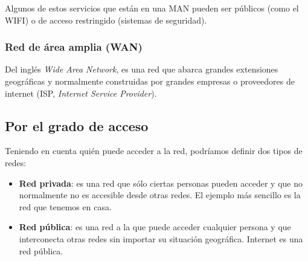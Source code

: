Algunos de estos servicios que están en una MAN pueden ser públicos (como el WIFI) o de acceso restringido (sistemas de seguridad).

\subsubsection{Red de área amplia (WAN)}
Del inglés \textit{Wide Area Network}, es una red que abarca grandes extensiones geográficas y normalmente construidas por grandes empresas o proveedores de internet (ISP, \textit{Internet Service Provider}).


\subsection{Por el grado de acceso}
Teniendo en cuenta quién puede acceder a la red, podríamos definir dos tipos de redes:

\begin{itemize}
    \item \textbf{Red privada}: es una red que sólo ciertas personas pueden acceder y que no normalmente no es accesible desde otras redes. El ejemplo más sencillo es la red que tenemos en casa.
    \item \textbf{Red pública}: es una red a la que puede acceder cualquier persona y que interconecta otras redes sin importar su situación geográfica. Internet es una red pública.
\end{itemize}


